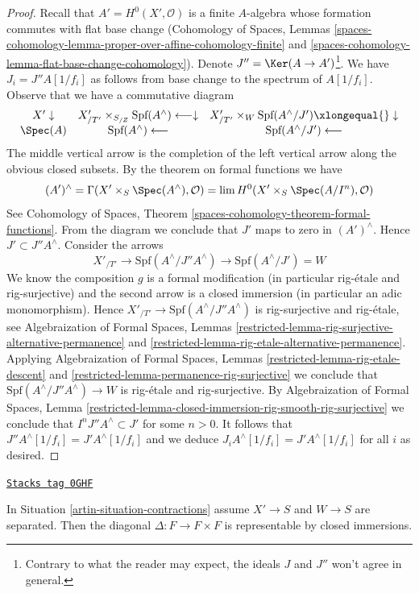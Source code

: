 \begin{proof}
\medskip\noindent
Recall that $A' = H^0(X', \mathcal{O})$ is a finite $A$-algebra
whose formation commutes with flat base change
(Cohomology of Spaces, Lemmas
\ref{spaces-cohomology-lemma-proper-over-affine-cohomology-finite} and
\ref{spaces-cohomology-lemma-flat-base-change-cohomology}). Denote
$J'' = \Ker(A \to A')$\footnote{Contrary to what the reader
may expect, the ideals $J$ and $J''$ won't agree in general.}.
We have $J_i = J''A[1/f_i]$ as follows
from base change to the spectrum of $A[1/f_i]$.
Observe that we have a commutative diagram
$$
\begin{array}{ccc}X' \downarrow & X'_{/T'} \times_{S_{/Z}} \text{Spf}(A^\wedge) \longleftarrow\downarrow & X'_{/T'} \times_W \text{Spf}(A^\wedge/J') \xlongequal{}\downarrow \\ \Spec(A) & \text{Spf}(A^\wedge) \longleftarrow & \text{Spf}(A^\wedge/J') \longleftarrow\end{array}
$$
The middle vertical arrow is the completion of the left vertical
arrow along the obvious closed subsets. By the theorem on formal
functions we have
$$
(A')^\wedge = \Gamma(X' \times_S \Spec(A^\wedge), \mathcal{O}) =
\lim H^0(X' \times_S \Spec(A/I^n), \mathcal{O})
$$
See Cohomology of Spaces, Theorem
\ref{spaces-cohomology-theorem-formal-functions}.
From the diagram we conclude that $J'$ maps to zero in $(A')^\wedge$.
Hence $J' \subset J'' A^\wedge$. Consider the arrows
$$
X'_{/T'} \to
\text{Spf}(A^\wedge/J''A^\wedge) \to
\text{Spf}(A^\wedge/J') = W
$$
We know the composition $g$ is a formal modification
(in particular rig-\'etale and rig-surjective) and the second
arrow is a closed immersion (in particular an adic monomorphism).
Hence $X'_{/T'} \to \text{Spf}(A^\wedge/J''A^\wedge)$ is
rig-surjective and rig-\'etale, see
Algebraization of Formal Spaces, Lemmas
\ref{restricted-lemma-rig-surjective-alternative-permanence} and
\ref{restricted-lemma-rig-etale-alternative-permanence}.
Applying Algebraization of Formal Spaces, Lemmas
\ref{restricted-lemma-rig-etale-descent} and
\ref{restricted-lemma-permanence-rig-surjective}
we conclude that $\text{Spf}(A^\wedge/J''A^\wedge) \to W$
is rig-\'etale and rig-surjective.
By Algebraization of Formal Spaces, Lemma
\ref{restricted-lemma-closed-immersion-rig-smooth-rig-surjective}
we conclude that $I^n J'' A^\wedge \subset J'$ for some $n > 0$.
It follows that $J'' A^\wedge[1/f_i] = J' A^\wedge[1/f_i]$ and
we deduce $J_i A^\wedge[1/f_i] = J' A^\wedge[1/f_i]$ for all
$i$ as desired.
\end{proof}

\begin{lemma}
\label{artin-lemma-diagonal-contractions}
\href{https://stacks.math.columbia.edu/tag/0GHF}{\texttt{Stacks tag 0GHF}}

In Situation \ref{artin-situation-contractions} assume $X' \to S$
and $W \to S$ are separated. Then the diagonal $\Delta : F \to F \times F$
is representable by closed immersions.
\end{lemma}

